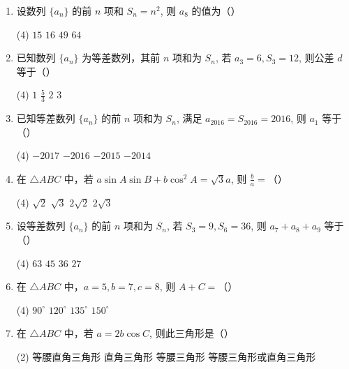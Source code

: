 \documentclass[17pt,twoside,space]{ctexart}
\begin{document}
\begin{enumerate}[itemsep=0.2em,topsep=0pt]

\item 设数列 $\{a_n\}$ 的前 $n$ 项和 $S_n=n^2$, 则 $a_8$ 的值为（\hspace{7pt}）
\begin{tasks}(4)
	\task $15$ \task $16$ \task $49$ \task $64$ 
\end{tasks}

\item 已知数列 $\{a_n\}$ 为等差数列，其前 $n$ 项和为 $S_n$, 若 $a_3=6, S_3=12$, 则公差 $d$ 等于（\hspace{7pt}）
\begin{tasks}(4)
	\task $1$ \task $\frac{5}{3}$ \task $2$ \task $3$ 
\end{tasks}

\item 已知等差数列 $\{a_n\}$ 的前 $n$ 项和为 $S_n$, 满足 $a_{2016}=S_{2016}=2016$, 则 $a_1$ 等于（\hspace{7pt}）
\begin{tasks}(4)
	\task $-2017$ \task $-2016$ \task $-2015$ \task $-2014$ 
\end{tasks}

\item 在 $\triangle ABC$ 中，若 $a\sin A \sin B+b\cos^2A=\sqrt{3}a$, 则 $\frac{b}{a}=$（\hspace{7pt}）
\begin{tasks}(4)
	\task $\sqrt{2}$ \task $\sqrt{3}$ \task $2\sqrt{2}$ \task $2\sqrt{3}$ 
\end{tasks}


\item 设等差数列 $\{a_n\}$ 的前 $n$ 项和为 $S_n$, 若 $S_3=9, S_6=36$, 则 $a_7+a_8+a_9$ 等于（\hspace{7pt}）
\begin{tasks}(4)
	\task $63$ \task $45$ \task $36$ \task $27$ 
\end{tasks}

\item 在 $\triangle ABC$ 中，$a=5, b=7, c=8$, 则 $A+C=$（\hspace{7pt}）
\begin{tasks}(4)
	\task $90^\circ$ \task $120^\circ$ \task $135^\circ$ \task $150^\circ$ 
\end{tasks}


\item 在 $\triangle ABC$ 中，若 $a=2b\cos C$, 则此三角形是（\hspace{7pt}）
\begin{tasks}(2)
	\task 等腰直角三角形 \task 直角三角形 \task 等腰三角形 \task 等腰三角形或直角三角形
\end{tasks}


\end{enumerate}
\end{document}
